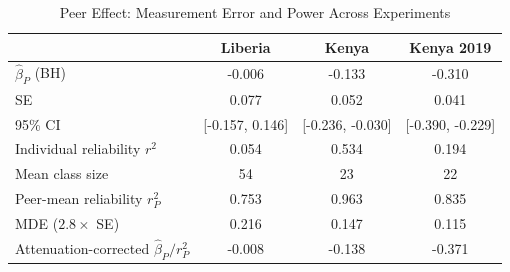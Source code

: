 \begin{table}[htbp]
\centering\small
\caption{Peer Effect: Measurement Error and Power Across Experiments}
\label{tab:peer_attenuation}
\begin{tabular}{lccc}
\toprule
 & Liberia & Kenya & Kenya 2019 \\
\midrule
$\hat{\beta}_P$ (BH) & -0.006 & -0.133 & -0.310 \\
SE & 0.077 & 0.052 & 0.041 \\
95\% CI & [-0.157, 0.146] & [-0.236, -0.030] & [-0.390, -0.229] \\
Individual reliability $r^2$ & 0.054 & 0.534 & 0.194 \\
Mean class size & 54 & 23 & 22 \\
Peer-mean reliability $r^2_P$ & 0.753 & 0.963 & 0.835 \\
MDE ($2.8 \times$ SE) & 0.216 & 0.147 & 0.115 \\
Attenuation-corrected $\hat{\beta}_P / r^2_P$ & -0.008 & -0.138 & -0.371 \\
\bottomrule
\end{tabular}
\par\smallskip{}
\end{table}
